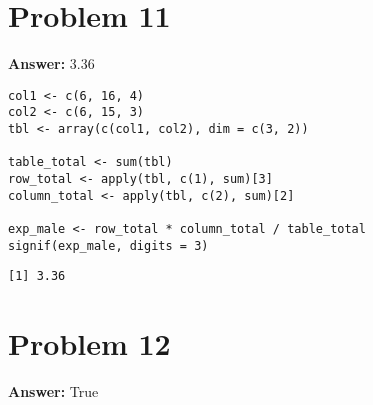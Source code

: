 \documentclass[11pt]{article}
\begin{document}
\section*{Problem 11}
\label{sec:orgb24b9f7}

\textbf{Answer:} 3.36

\begin{verbatim}
col1 <- c(6, 16, 4)
col2 <- c(6, 15, 3)
tbl <- array(c(col1, col2), dim = c(3, 2))

table_total <- sum(tbl)
row_total <- apply(tbl, c(1), sum)[3]
column_total <- apply(tbl, c(2), sum)[2]

exp_male <- row_total * column_total / table_total
signif(exp_male, digits = 3)
\end{verbatim}

\label{}
\begin{verbatim}
[1] 3.36
\end{verbatim}
\section*{Problem 12}
\label{sec:orgf8e1684}

\textbf{Answer:} True
\end{document}
